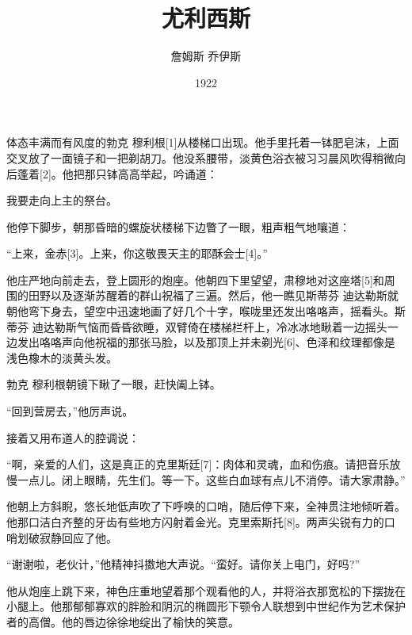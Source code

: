 \documentclass{article}
\title{尤利西斯}
\author{詹姆斯 乔伊斯}
\date{1922}
\begin{document}



\Large



体态丰满而有风度的勃克 \cdot 穆利根[1]从楼梯口出现。他手里托着一钵肥皂沫，上面交叉放了一面镜子和一把剃胡刀。他没系腰带，淡黄色浴衣被习习晨风吹得稍微向后蓬着[2]。他把那只钵高高举起，吟诵道：



我要走向上主的祭台。



他停下脚步，朝那昏暗的螺旋状楼梯下边瞥了一眼，粗声粗气地嚷道：



“上来，金赤[3]。上来，你这敬畏天主的耶酥会士[4]。”



他庄严地向前走去，登上圆形的炮座。他朝四下里望望，肃穆地对这座塔[5]和周围的田野以及逐渐苏醒着的群山祝福了三遍。然后，他一瞧见斯蒂芬 \cdot 迪达勒斯就朝他弯下身去，望空中迅速地画了好几个十字，喉咙里还发出咯咯声，摇看头。斯蒂芬 \cdot 迪达勒斯气恼而昏昏欲睡，双臂倚在楼梯栏杆上，冷冰冰地瞅着一边摇头一边发出咯咯声向他祝福的那张马脸，以及那顶上并未剃光[6]、色泽和纹理都像是浅色橡木的淡黄头发。



勃克 \cdot 穆利根朝镜下瞅了一眼，赶快阖上钵。



“回到营房去，”他厉声说。



接着又用布道人的腔调说：



“啊，亲爱的人们，这是真正的克里斯廷[7]：肉体和灵魂，血和伤痕。请把音乐放慢一点儿。闭上眼睛，先生们。等一下。这些白血球有点儿不消停。请大家肃静。”



他朝上方斜睨，悠长地低声吹了下呼唤的口哨，随后停下来，全神贯注地倾听着。他那口洁白齐整的牙齿有些地方闪射着金光。克里索斯托[8]。两声尖锐有力的口哨划破寂静回应了他。



“谢谢啦，老伙计，”他精神抖擞地大声说。“蛮好。请你关上电门，好吗?”



他从炮座上跳下来，神色庄重地望着那个观看他的人，并将浴衣那宽松的下摆拢在小腿上。他那郁郁寡欢的胖脸和阴沉的椭圆形下颚令人联想到中世纪作为艺术保护者的高僧。他的唇边徐徐地绽出了榆快的笑意。
\end{document}
